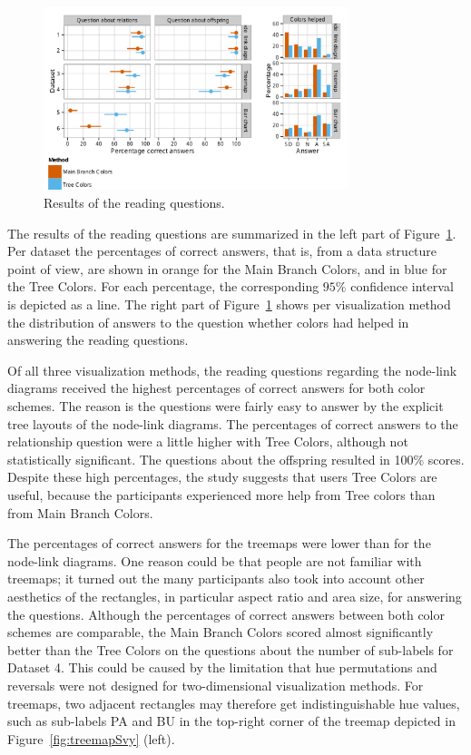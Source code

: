 \documentclass[journal]{vgtc}                %
\begin{document}
\begin{figure}[!b]
  \centering
  \vspace{-2ex}
	\includegraphics[width=3.5in]{user_study_results_mod2.pdf}
  \caption{Results of the reading questions.}\label{fig:user1}
\end{figure}


The results of the reading questions are summarized in the left part of Figure~\ref{fig:user1}. Per dataset the percentages of correct answers, that is, from a data structure point of view, are shown in orange for the Main Branch Colors, and in blue for the Tree Colors. For each percentage, the corresponding $95\%$ confidence interval is depicted as a line. The right part of Figure~\ref{fig:user1} shows per visualization method the distribution of answers to the question whether colors had helped in answering the reading questions.

Of all three visualization methods, the reading questions regarding the node-link diagrams received the highest percentages of correct answers for both color schemes. The reason is the questions were fairly easy to answer by the explicit tree layouts of the node-link diagrams. 
The percentages of correct answers to the relationship question were a little higher with Tree Colors, although not statistically significant. The questions about the offspring resulted in 100\% scores. %
Despite these high percentages, the study suggests that users Tree Colors are useful, because the participants experienced more help from Tree colors than from Main Branch Colors.

The percentages of correct answers for the treemaps were lower than for the node-link diagrams. One reason could be that people are not familiar with treemaps; it turned out the many participants also took into account other aesthetics of the rectangles, in particular aspect ratio and area size, for answering the questions. Although the percentages of correct answers between both color schemes are comparable, the Main Branch Colors scored almost significantly better than the Tree Colors on the questions about the number of sub-labels for Dataset 4. This could be caused by the limitation that hue permutations and reversals were not designed for two-dimensional visualization methods. For treemaps, two adjacent rectangles may therefore get indistinguishable hue values, such as sub-labels PA and BU in the top-right corner of the treemap depicted in Figure~\ref{fig:treemapSvy} (left).
\end{document}
